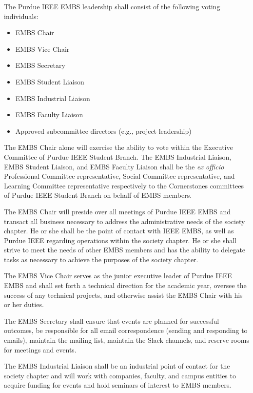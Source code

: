 \documentclass[12pt]{constitution}
\begin{document}
The Purdue IEEE EMBS leadership shall consist of the following voting individuals:
\begin{itemize}
    \item EMBS Chair
    \item EMBS Vice Chair
    \item EMBS Secretary
    \item EMBS Student Liaison
    \item EMBS Industrial Liaison 
    \item EMBS Faculty Liaison
    \item Approved subcommittee directors (e.g., project leadership)
\end{itemize}

The EMBS Chair alone will exercise the ability to vote within the Executive Committee of Purdue IEEE Student Branch. The EMBS Industrial Liaison, EMBS Student Liaison, and EMBS Faculty Liaison shall be the \textit{ex officio} Professional Committee representative, Social Committee representative, and Learning Committee representative respectively to the Cornerstones committees of Purdue IEEE Student Branch on behalf of EMBS members.

The EMBS Chair will preside over all meetings of Purdue IEEE EMBS and transact all business necessary to address the administrative needs of the society chapter. He or she shall be the point of contact with IEEE EMBS, as well as Purdue IEEE regarding operations within the society chapter. He or she shall strive to meet the needs of other EMBS members and has the ability to delegate tasks as necessary to achieve the purposes of the society chapter.

The EMBS Vice Chair serves as the junior executive leader of Purdue IEEE EMBS and shall set forth a technical direction for the academic year, oversee the success of any technical projects, and otherwise assist the EMBS Chair with his or her duties.

The EMBS Secretary shall ensure that events are planned for successful outcomes, be responsible for all email correspondence (sending and responding to emails), maintain the mailing list, maintain the Slack channels, and reserve rooms for meetings and events.

The EMBS Industrial Liaison shall be an industrial point of contact for the society chapter and will work with companies, faculty, and campus entities to acquire funding for events and hold seminars of interest to EMBS members.
\end{document}
